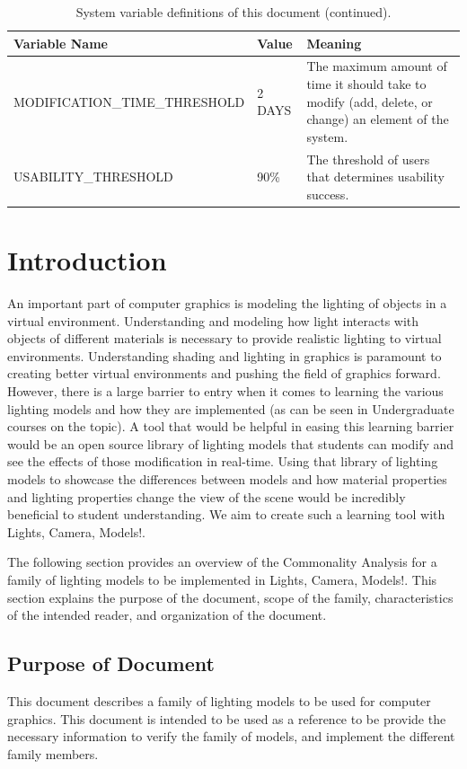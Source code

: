 \documentclass[12pt]{article}
\newcommand{\famname}{Lights, Camera, Models!} %
\begin{document}
\begin{table}[H]
	\begin{tabular}{|l|l|p{7cm}|}
		\hline
		\textbf{Variable Name} & \textbf{Value}& \textbf{Meaning} \\
		\hline
		MODIFICATION\_TIME\_THRESHOLD & 2 DAYS & The maximum amount of time it 
		should take to modify (add, delete, or change) an element of the 
		system.\\
		USABILITY\_THRESHOLD & 90\% & The threshold of users that 
		determines usability success.\\
		\hline
	\end{tabular}
	\caption{System variable definitions of this document (continued).}
	\label{tbl:system-variables-2}
\end{table}

\section{Introduction}
An important part of computer graphics is modeling the lighting 
of objects in a virtual environment. Understanding and modeling how light 
interacts with objects of different materials is necessary to provide realistic 
lighting to virtual environments. Understanding shading and lighting in 
graphics is paramount to creating better virtual environments and pushing the 
field of graphics forward. However, there is a large barrier to entry when it 
comes to learning the various lighting models and how they are implemented (as 
can be seen in Undergraduate courses on the topic). A tool that would be 
helpful in easing this learning barrier would be an open source library of 
lighting models that students can modify and see the effects of those 
modification in real-time. Using that library of lighting models to showcase 
the differences between models and how material properties and lighting 
properties change the view of the scene would be incredibly beneficial to 
student understanding. We aim to create such a learning tool with \famname.

The following section provides an overview of the Commonality Analysis for a 
family of lighting models to be implemented in \famname. This section explains 
the purpose of the document, scope of the family, characteristics of the 
intended reader, and organization of the document.

\subsection{Purpose of Document}
This document describes a family of lighting models to be used for computer 
graphics. This document is intended to be used as a reference to be provide the 
necessary information to verify the family of models, and implement the 
different family members. 
\end{document}
